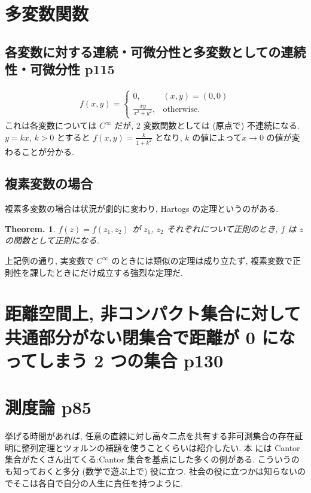 \documentclass[openany, a4paper, oneside]{jsbook}
\theoremstyle{break}
\theoremstyle{breakdefn}
\newtheorem{thm}{Theorem.}[section]
\begin{document}
\section{多変数関数}

\subsection{各変数に対する連続・可微分性と多変数としての連続性・可微分性 \cite{GelbaumOlmsted1} p115}


\begin{align}
 f (x, y)
 =
 \begin{cases}
  0,                  & (x, y) = (0, 0) \\
  \frac{xy}{x^2+y^2}, & \mathrm{otherwise}.
 \end{cases}
\end{align}
これは各変数については $C^{\infty}$ だが, 2 変数関数としては (原点で) 不連続になる.
$y = k x$, $k > 0$ とすると $f (x, y) = \frac{k}{1 + k^2}$ となり, $k$ の値によって$x \to 0$ の値が変わることが分かる.
\subsection{複素変数の場合}


複素多変数の場合は状況が劇的に変わり, Hartogs の定理というのがある.
\begin{thm}
 $f (z) = f (z_1, z_2)$ が $z_1$, $z_2$ それぞれについて正則のとき, $f$ は $z$ の関数として正則になる.
\end{thm}
上記例の通り, 実変数で $C^{\infty}$ のときには類似の定理は成り立たず, 複素変数で正則性を課したときにだけ成立する強烈な定理だ.
\section{距離空間上, 非コンパクト集合に対して共通部分がない閉集合で距離が 0 になってしまう 2 つの集合 \cite{GelbaumOlmsted1} p130}

\section{測度論 \cite{GelbaumOlmsted1} p85}


挙げる時間があれば, 任意の直線に対し高々二点を共有する非可測集合の存在証明に整列定理とツォルンの補題を使うことくらいは紹介したい.
本 \cite{GelbaumOlmsted1} には Cantor 集合がたくさん出てくる:Cantor 集合を基点にした多くの例がある.
こういうのも知っておくと多分 (数学で遊ぶ上で) 役に立つ.
社会の役に立つかは知らないのでそこは各自で自分の人生に責任を持つように.
\end{document}
